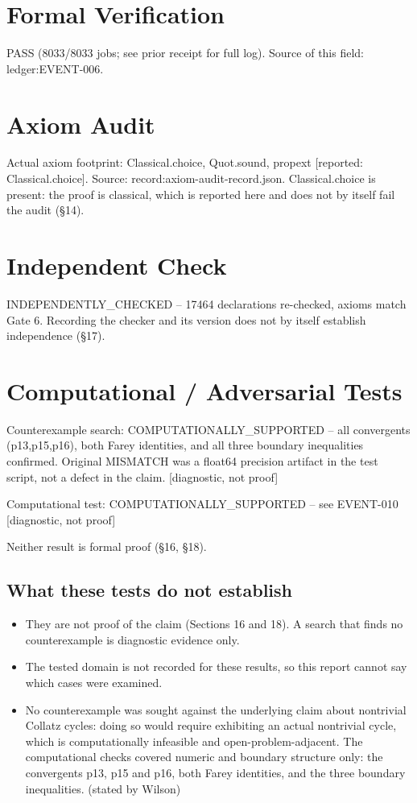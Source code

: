 \documentclass[11pt]{article}
\begin{document}
\section{Formal Verification}
PASS (8033/8033 jobs; see prior receipt for full log).
Source of this field: ledger:EVENT-006.
\section{Axiom Audit}
Actual axiom footprint: Classical.choice, Quot.sound, propext  [reported: Classical.choice].
Source: record:axiom-audit-record.json.
Classical.choice is present: the proof is classical, which is reported here and does not by itself fail the audit (\S{}14).
\section{Independent Check}
INDEPENDENTLY\_CHECKED -- 17464 declarations re-checked, axioms match Gate 6.
Recording the checker and its version does not by itself establish independence (\S{}17).
\section{Computational / Adversarial Tests}
Counterexample search: COMPUTATIONALLY\_SUPPORTED -- all convergents (p13,p15,p16), both Farey identities, and all three boundary inequalities confirmed. Original MISMATCH was a float64 precision artifact in the test script, not a defect in the claim. [diagnostic, not proof]

Computational test: COMPUTATIONALLY\_SUPPORTED -- see EVENT-010 [diagnostic, not proof]

Neither result is formal proof (\S{}16, \S{}18).
\subsection*{What these tests do not establish}
\begin{itemize}
\item They are not proof of the claim (Sections 16 and 18). A search that finds no counterexample is diagnostic evidence only.
\item The tested domain is not recorded for these results, so this report cannot say which cases were examined.
\item No counterexample was sought against the underlying claim about nontrivial Collatz cycles: doing so would require exhibiting an actual nontrivial cycle, which is computationally infeasible and open-problem-adjacent. The computational checks covered numeric and boundary structure only: the convergents p13, p15 and p16, both Farey identities, and the three boundary inequalities. (stated by Wilson)
\end{itemize}
\end{document}
